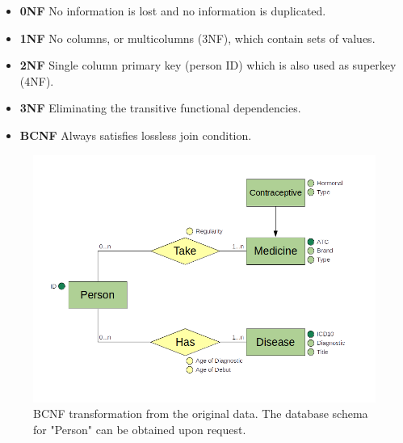 \begin{itemize}

    \item \textbf{0NF} No information is lost and no information is duplicated.
    \item \textbf{1NF} No columns, or multicolumns (3NF), which contain sets of values.
    \item \textbf{2NF} Single column primary key (person ID) which is also used as superkey (4NF).
    \item \textbf{3NF} Eliminating the transitive functional dependencies.
    \item \textbf{BCNF} Always satisfies lossless join condition.

\end{itemize}

\begin{figure}[H]
        \centering
            \includegraphics[width=0.75\linewidth]{figures/Methodology/DBrelationals.png} 
        \caption{BCNF transformation from the original data. The database schema for "Person" can be obtained upon request.}
        \label{fig:Database_relational_image}
\end{figure}



